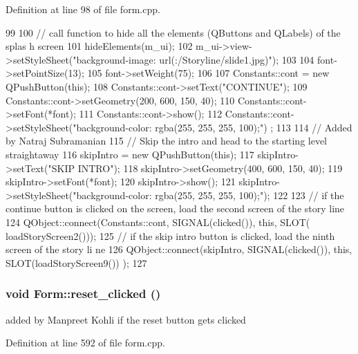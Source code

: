 Definition at line 98 of file form.cpp.


\begin{DoxyCode}
99 {
100     // call function to hide all the elements (QButtons and QLabels) of the splas
      h screen
101     hideElements(m_ui);
102     m_ui->view->setStyleSheet("background-image: url(:/Storyline/slide1.jpg)");
103 
104     font->setPointSize(13);
105     font->setWeight(75);
106 
107     Constants::cont = new QPushButton(this);
108     Constants::cont->setText("CONTINUE");
109     Constants::cont->setGeometry(200, 600, 150, 40);
110     Constants::cont->setFont(*font);
111     Constants::cont->show();
112     Constants::cont->setStyleSheet("background-color: rgba(255, 255, 255, 100);")
      ;
113 
114     // Added by Natraj Subramanian
115     // Skip the intro and head to the starting level straightaway
116     skipIntro = new QPushButton(this);
117     skipIntro->setText("SKIP INTRO");
118     skipIntro->setGeometry(400, 600, 150, 40);
119     skipIntro->setFont(*font);
120     skipIntro->show();
121     skipIntro->setStyleSheet("background-color: rgba(255, 255, 255, 100);");
122 
123     // if the continue button is clicked on the screen, load the second screen of
       the story line
124     QObject::connect(Constants::cont, SIGNAL(clicked()), this, SLOT(
      loadStoryScreen2()));
125     // if the skip intro button is clicked, load the ninth screen of the story li
      ne
126     QObject::connect(skipIntro, SIGNAL(clicked()), this, SLOT(loadStoryScreen9())
      );
127 }
\end{DoxyCode}
\hypertarget{class_form_a642d6b971b9ea8e9e1b96c88426ca6f8}{
\subsubsection[{reset\_\-clicked}]{\setlength{\rightskip}{0pt plus 5cm}void Form::reset\_\-clicked ()}}
\label{class_form_a642d6b971b9ea8e9e1b96c88426ca6f8}
added by Manpreet Kohli if the reset button gets clicked 

Definition at line 592 of file form.cpp.


